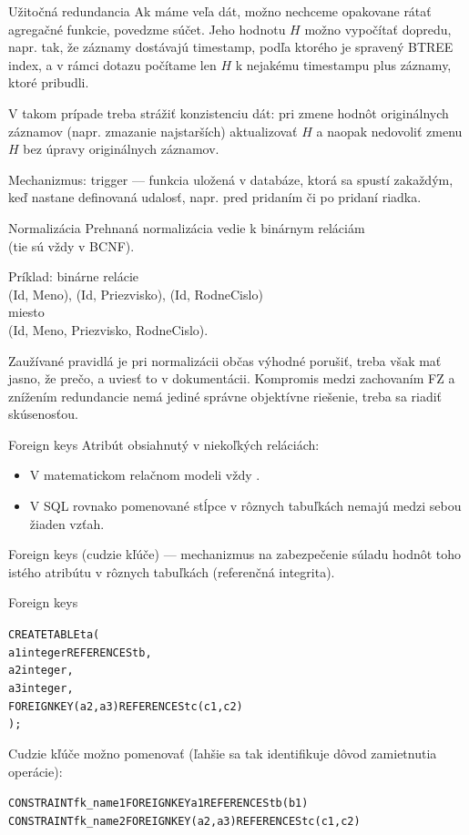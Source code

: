 \documentclass[12pt]{beamer}
\begin{document}
\begin{frame}{Užitočná redundancia}
Ak máme veľa dát, možno nechceme opakovane rátať agregačné funkcie, povedzme súčet.
Jeho hodnotu $H$ možno vypočítať dopredu, napr. tak, že záznamy dostávajú timestamp,
podľa ktorého je spravený BTREE index, a v rámci dotazu počítame
len $H$ k nejakému timestampu plus záznamy, ktoré pribudli.

\bigskip
V takom prípade treba strážiť konzistenciu dát: pri zmene hodnôt originálnych záznamov
(napr. zmazanie najstarších) aktualizovať $H$ a naopak nedovoliť zmenu $H$ bez úpravy originálnych záznamov.

\bigskip
Mechanizmus: \alert{trigger} --- funkcia uložená v databáze, ktorá sa spustí zakaždým,
keď nastane definovaná udalosť, napr. pred pridaním či po pridaní riadka.
\end{frame}

\begin{frame}[fragile]{Normalizácia}
Prehnaná normalizácia vedie k binárnym reláciám\\
(tie sú vždy v BCNF).

\bigskip
Príklad: binárne relácie\\
(Id, Meno), (Id, Priezvisko), (Id, RodneCislo)\\
miesto\\
(Id, Meno, Priezvisko, RodneCislo).

\bigskip
Zaužívané pravidlá je pri normalizácii občas výhodné porušiť,
treba však mať jasno, že prečo, a uviesť to v dokumentácii.
Kompromis medzi zachovaním FZ a znížením redundancie nemá
jediné správne objektívne riešenie, treba sa riadiť skúsenosťou.
\end{frame}


\begin{frame}[fragile]{Foreign keys}
Atribút obsiahnutý v niekoľkých reláciách:
\begin{itemize}
\item V matematickom relačnom modeli vždy .
\item V SQL rovnako pomenované stĺpce v rôznych tabuľkách nemajú medzi sebou žiaden vzťah.
\end{itemize}
\alert{Foreign keys} (cudzie kľúče) --- mechanizmus na zabezpečenie súladu hodnôt toho istého atribútu v rôznych tabuľkách (referenčná integrita).
\end{frame}

\begin{frame}[fragile]{Foreign keys}
\begin{alltt}
CREATE TABLE ta (
  a1 integer \alert{REFERENCES tb},
  a2 integer,
  a3 integer,
  \alert{FOREIGN KEY (a2, a3) REFERENCES tc (c1, c2)}
);
\end{alltt}
Cudzie kľúče možno pomenovať (ľahšie sa tak identifikuje dôvod zamietnutia operácie):
{\scriptsize
\begin{alltt}
  CONSTRAINT fk_name1 FOREIGN KEY a1 REFERENCES tb (b1)
  CONSTRAINT fk_name2 FOREIGN KEY (a2, a3) REFERENCES tc (c1, c2)
\end{alltt}
}
\end{frame}
\end{document}
